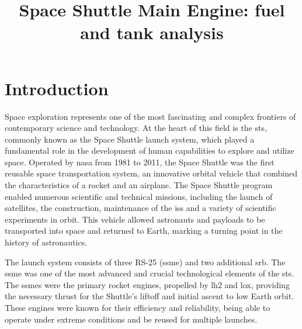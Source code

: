 
\graphicspath{ {./figures/} }


\title{Space Shuttle Main Engine: fuel and tank analysis}

    \maketitle
    \tableofcontents
    \newpage
    \printglossary[type=\acronymtype]
    \newpage
    \section{Introduction} \label{intro}
    Space exploration represents one of the most fascinating and complex frontiers of contemporary science and technology. 
	At the heart of this field is the \acrfull{sts}, commonly known as the Space Shuttle launch system, which played a fundamental role in the development of human capabilities to explore and utilize space.
	Operated by \acrshort{nasa} from 1981 to 2011, the Space Shuttle was the first reusable space transportation system, an innovative orbital vehicle that combined the characteristics of a rocket and an airplane.
The Space Shuttle program enabled numerous scientific and technical missions, including the launch of satellites, the construction, maintenance of the \acrfull{iss} and a variety of scientific experiments in orbit.
This vehicle allowed astronauts and payloads to be transported into space and returned to Earth, marking a turning point in the history of astronautics.


The launch system consists of three RS-25 (\acrshort{ssme}) and two additional \acrfull{srb}. The \acrfull{ssme} was one of the most advanced and crucial technological elements of the \acrshort{sts}. The \acrshort{ssme}s were the primary rocket engines, propelled by \acrfull{lh2} and \acrfull{lox}, providing the necessary thrust for the Shuttle's liftoff and initial ascent to low Earth orbit. These engines were known for their efficiency and reliability, being able to operate under extreme conditions and be reused for multiple launches.


